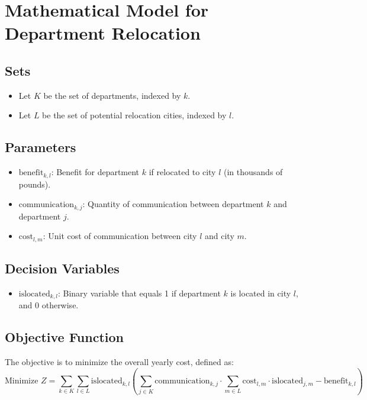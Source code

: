 \documentclass{article}
\begin{document}
\section*{Mathematical Model for Department Relocation}

\subsection*{Sets}
\begin{itemize}
    \item Let \( K \) be the set of departments, indexed by \( k \).
    \item Let \( L \) be the set of potential relocation cities, indexed by \( l \).
\end{itemize}

\subsection*{Parameters}
\begin{itemize}
    \item \( \text{benefit}_{k, l} \): Benefit for department \( k \) if relocated to city \( l \) (in thousands of pounds).
    \item \( \text{communication}_{k, j} \): Quantity of communication between department \( k \) and department \( j \).
    \item \( \text{cost}_{l, m} \): Unit cost of communication between city \( l \) and city \( m \).
\end{itemize}

\subsection*{Decision Variables}
\begin{itemize}
    \item \( \text{islocated}_{k, l} \): Binary variable that equals 1 if department \( k \) is located in city \( l \), and 0 otherwise.
\end{itemize}

\subsection*{Objective Function}
The objective is to minimize the overall yearly cost, defined as:
\[
\text{Minimize } Z = \sum_{k \in K} \sum_{l \in L} \text{islocated}_{k, l} \left( \sum_{j \in K} \text{communication}_{k, j} \cdot \sum_{m \in L} \text{cost}_{l, m} \cdot \text{islocated}_{j, m} - \text{benefit}_{k, l} \right)
\]
\end{document}
